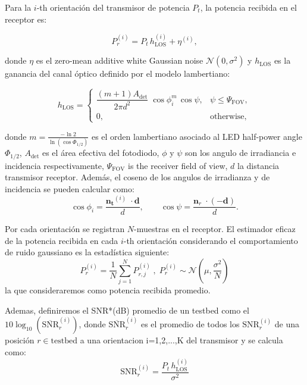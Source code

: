\documentclass[lettersize,journal]{IEEEtran}
\begin{document}
Para la $i$-th orientación del transmisor de potencia $P_t$, la potencia recibida en el receptor es:

\begin{equation}
P_{r}^{(i)} = P_t\,h_{\mathrm{LOS}}^{(i)} + \eta^{(i)},
\label{eq:received_power}
\end{equation}

donde $\eta$ es el zero-mean additive white Gaussian noise $\mathcal N(0,\sigma^2)$ y $h_\mathrm{LOS}$ es la ganancia del canal óptico definido por el modelo lambertiano:

\begin{equation}
h_{\mathrm{LOS}} =
\begin{cases}
\dfrac{(m+1)A_{\mathrm{det}}}{2\pi d^{2}}\;\cos\phi_i^{m}\,\cos\psi, & \psi \le \Psi_{\mathrm{FOV}},\\[6pt]
0,&\text{otherwise},
\end{cases}
\label{eq:h_los}
\end{equation}

donde $m=\frac{-\ln 2}{\ln(\cos\Phi_{1/2})}$ es el orden lambertiano asociado al LED half-power angle $\Phi_{1/2}$, $A_{\mathrm{det}}$ es el área efectiva del fotodiodo, $\phi$ y $\psi$ son los angulo de irradiancia e incidencia respectivamente, $\Psi_{\mathrm{FOV}}$ is the receiver field of view, $d$ la distancia transmisor receptor. Además, el coseno de los angulos de irradianza y de incidencia se pueden calcular como:
\begin{equation}
    \cos\phi_i = \frac{\mathbf{n_{t}}^{(i)}\;\cdot\mathbf{d}}{d},
    \qquad    
    \cos\psi   = \frac{\mathbf n_{r}\;\cdot(-\mathbf{d})}{d}.
\label{eq:cosenos}
\end{equation}


Por cada orientación se registran $N$-muestras en el receptor. El estimador eficaz de la potencia recibida en cada $i$-th orientación considerando el comportamiento de ruido gaussiano es la estadística siguiente:
\begin{equation}
    P_r^{(i)}=\frac{1}{N}\sum_{j=1}^{N}{P_{r,j}^{(i)}}\;,\; P_r^{(i)}\sim \mathcal N(\mu,\frac{\sigma^2}{N})
    \label{eq:promedios}
\end{equation}
la que consideraremos como potencia recibida promedio.

Ademas, definiremos el SNR*(dB) promedio de un testbed como el $10\log_{10}(\overline{\mathrm{SNR}}_{r}^{(i)})$, donde $\overline{\mathrm{SNR}}_{r}^{(i)}$ es el promedio de todos los $\mathrm{SNR}_{r}^{(i)}$ de una posición $r \in \mathrm{testbed}$ a una orientacion i=1,2,...,K del transmisor y se calcula como:
\begin{equation}
\mathrm{SNR}_{r}^{(i)}=\frac{P_t\,h_{\mathrm{LOS}}^{(i)}}{\sigma^2}
\end{equation}
\end{document}
